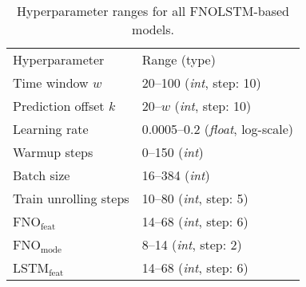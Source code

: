 \begin{table}[h]
\centering
\begin{tabular}{p{4cm}p{4cm}}
Hyperparameter & Range (type) \\
\cmidrule[\heavyrulewidth]{1-2}
Time window $w$ & \numrange{20}{100} (\textit{int}, step: 10) \\
Prediction offset $k$ & 20--$w$ (\textit{int}, step: 10) \\
Learning rate & \numrange{0.0005}{0.2} (\textit{float}, log-scale) \\
Warmup steps & \numrange{0}{150} (\textit{int}) \\
Batch size & \numrange{16}{384} (\textit{int}) \\
Train unrolling steps & \numrange{10}{80} (\textit{int}, step: 5) \\
FNO$_\text{feat}$ & \numrange{14}{68} (\textit{int}, step: 6) \\
FNO$_\text{mode}$  & \numrange{8}{14} (\textit{int}, step: 2) \\
LSTM$_\text{feat}$ & \numrange{14}{68} (\textit{int}, step: 6) \\
\end{tabular}
\caption{Hyperparameter ranges for all FNOLSTM-based models. }
\label{tab:hyperparamnn}
\end{table}
